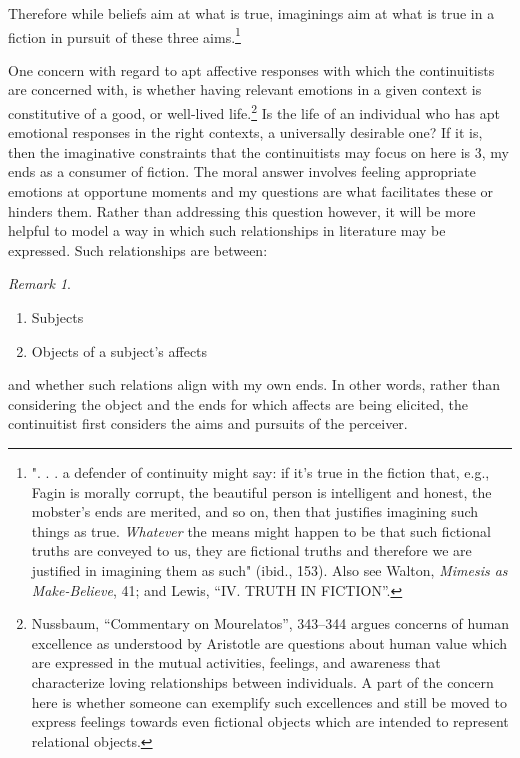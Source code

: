 \documentclass[
  12pt,
]{book}
\providecommand{\tightlist}{%
  \setlength{\itemsep}{0pt}\setlength{\parskip}{0pt}}
\providecommand{\tightlist}{%
  \setlength{\itemsep}{0pt}\setlength{\parskip}{0pt}}
\theoremstyle{definition}
\theoremstyle{definition}
\theoremstyle{definition}
\theoremstyle{definition}
\theoremstyle{remark}
\newtheorem*{remark}{Remark}
\begin{document}
\noindent Therefore while beliefs aim at what is true, imaginings aim at what is true in a fiction in pursuit of these three aims.\footnote{". . . a defender of continuity might say: if it's true in the fiction that, e.g., Fagin is morally corrupt, the beautiful person is intelligent and honest, the mobster's ends are merited, and so on, then that justifies imagining such things as true. \emph{Whatever} the means might happen to be that such fictional truths are conveyed to us, they are fictional truths and therefore we are justified in imagining them as such" (ibid., 153). Also see Walton, \emph{Mimesis as {Make-Believe}}, 41; and Lewis, {``{IV}. {TRUTH IN FICTION}''}.}

One concern with regard to apt affective responses with which the continuitists are concerned with, is whether having relevant emotions in a given context is constitutive of a good, or well-lived life.\footnote{Nussbaum, {``Commentary on {Mourelatos}''}, 343--344 argues concerns of human excellence as understood by Aristotle are questions about human value which are expressed in the mutual activities, feelings, and awareness that characterize loving relationships between individuals. A part of the concern here is whether someone can exemplify such excellences and still be moved to express feelings towards even fictional objects which are intended to represent relational objects.} Is the life of an individual who has apt emotional responses in the right contexts, a universally desirable one? If it is, then the imaginative constraints that the continuitists may focus on here is 3, my ends as a consumer of fiction. The moral answer involves feeling appropriate emotions at opportune moments and my questions are what facilitates these or hinders them. Rather than addressing this question however, it will be more helpful to model a way in which such relationships in literature may be expressed. Such relationships are between:

\begin{remark}
\leavevmode

\begin{enumerate}
\def\labelenumi{\arabic{enumi}.}
\tightlist
\item
  Subjects
\item
  Objects of a subject's affects
\end{enumerate}

\end{remark}

\noindent and whether such relations align with my own ends. In other words, rather than considering the object and the ends for which affects are being elicited, the continuitist first considers the aims and pursuits of the perceiver.
\end{document}
